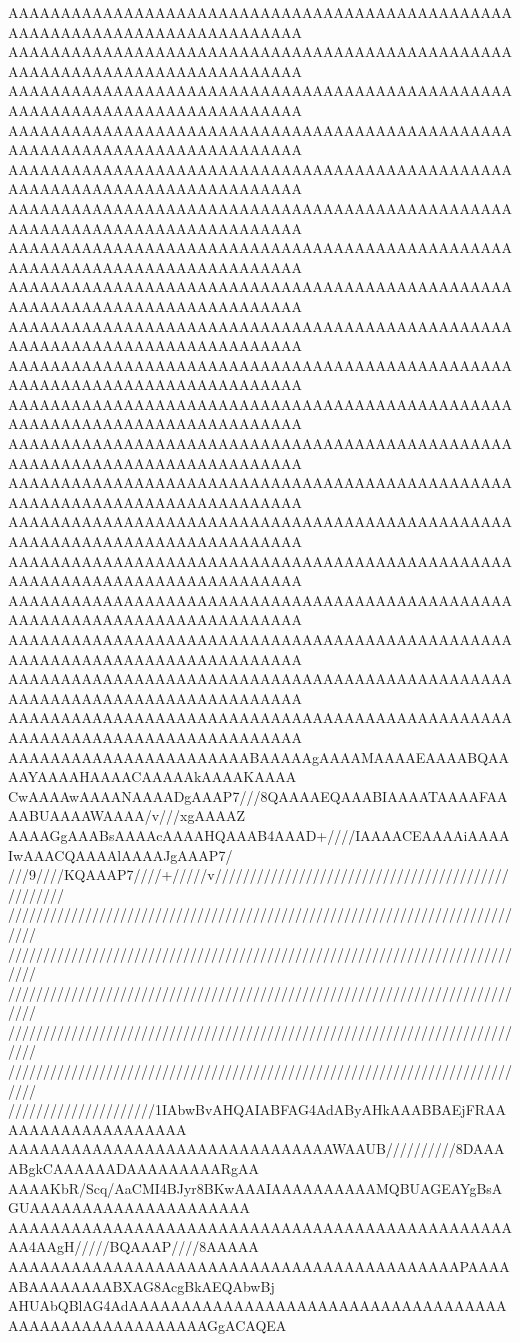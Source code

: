 AAAAAAAAAAAAAAAAAAAAAAAAAAAAAAAAAAAAAAAAAAAAAAAAAAAAAAAAAAAAAAAAAAAAAAAAAAAA
AAAAAAAAAAAAAAAAAAAAAAAAAAAAAAAAAAAAAAAAAAAAAAAAAAAAAAAAAAAAAAAAAAAAAAAAAAAA
AAAAAAAAAAAAAAAAAAAAAAAAAAAAAAAAAAAAAAAAAAAAAAAAAAAAAAAAAAAAAAAAAAAAAAAAAAAA
AAAAAAAAAAAAAAAAAAAAAAAAAAAAAAAAAAAAAAAAAAAAAAAAAAAAAAAAAAAAAAAAAAAAAAAAAAAA
AAAAAAAAAAAAAAAAAAAAAAAAAAAAAAAAAAAAAAAAAAAAAAAAAAAAAAAAAAAAAAAAAAAAAAAAAAAA
AAAAAAAAAAAAAAAAAAAAAAAAAAAAAAAAAAAAAAAAAAAAAAAAAAAAAAAAAAAAAAAAAAAAAAAAAAAA
AAAAAAAAAAAAAAAAAAAAAAAAAAAAAAAAAAAAAAAAAAAAAAAAAAAAAAAAAAAAAAAAAAAAAAAAAAAA
AAAAAAAAAAAAAAAAAAAAAAAAAAAAAAAAAAAAAAAAAAAAAAAAAAAAAAAAAAAAAAAAAAAAAAAAAAAA
AAAAAAAAAAAAAAAAAAAAAAAAAAAAAAAAAAAAAAAAAAAAAAAAAAAAAAAAAAAAAAAAAAAAAAAAAAAA
AAAAAAAAAAAAAAAAAAAAAAAAAAAAAAAAAAAAAAAAAAAAAAAAAAAAAAAAAAAAAAAAAAAAAAAAAAAA
AAAAAAAAAAAAAAAAAAAAAAAAAAAAAAAAAAAAAAAAAAAAAAAAAAAAAAAAAAAAAAAAAAAAAAAAAAAA
AAAAAAAAAAAAAAAAAAAAAAAAAAAAAAAAAAAAAAAAAAAAAAAAAAAAAAAAAAAAAAAAAAAAAAAAAAAA
AAAAAAAAAAAAAAAAAAAAAAAAAAAAAAAAAAAAAAAAAAAAAAAAAAAAAAAAAAAAAAAAAAAAAAAAAAAA
AAAAAAAAAAAAAAAAAAAAAAAAAAAAAAAAAAAAAAAAAAAAAAAAAAAAAAAAAAAAAAAAAAAAAAAAAAAA
AAAAAAAAAAAAAAAAAAAAAAAAAAAAAAAAAAAAAAAAAAAAAAAAAAAAAAAAAAAAAAAAAAAAAAAAAAAA
AAAAAAAAAAAAAAAAAAAAAAAAAAAAAAAAAAAAAAAAAAAAAAAAAAAAAAAAAAAAAAAAAAAAAAAAAAAA
AAAAAAAAAAAAAAAAAAAAAAAAAAAAAAAAAAAAAAAAAAAAAAAAAAAAAAAAAAAAAAAAAAAAAAAAAAAA
AAAAAAAAAAAAAAAAAAAAAAAAAAAAAAAAAAAAAAAAAAAAAAAAAAAAAAAAAAAAAAAAAAAAAAAAAAAA
AAAAAAAAAAAAAAAAAAAAAAAAAAAAAAAAAAAAAAAAAAAAAAAAAAAAAAAAAAAAAAAAAAAAAAAAAAAA
AAAAAAAAAAAAAAAAAAAAAAABAAAAAgAAAAMAAAAEAAAABQAAAAYAAAAHAAAACAAAAAkAAAAKAAAA
CwAAAAwAAAANAAAADgAAAP7///8QAAAAEQAAABIAAAATAAAAFAAAABUAAAAWAAAA/v///xgAAAAZ
AAAAGgAAABsAAAAcAAAAHQAAAB4AAAD+////IAAAACEAAAAiAAAAIwAAACQAAAAlAAAAJgAAAP7/
///9////KQAAAP7////+/////v//////////////////////////////////////////////////
////////////////////////////////////////////////////////////////////////////
////////////////////////////////////////////////////////////////////////////
////////////////////////////////////////////////////////////////////////////
////////////////////////////////////////////////////////////////////////////
////////////////////////////////////////////////////////////////////////////
/////////////////////1IAbwBvAHQAIABFAG4AdAByAHkAAABBAEjFRAAAAAAAAAAAAAAAAAAA
AAAAAAAAAAAAAAAAAAAAAAAAAAAAAAAWAAUB//////////8DAAAABgkCAAAAAADAAAAAAAAARgAA
AAAAKbR/Scq/AaCMI4BJyr8BKwAAAIAAAAAAAAAAMQBUAGEAYgBsAGUAAAAAAAAAAAAAAAAAAAAA
AAAAAAAAAAAAAAAAAAAAAAAAAAAAAAAAAAAAAAAAAAAAAAAAAA4AAgH/////BQAAAP////8AAAAA
AAAAAAAAAAAAAAAAAAAAAAAAAAAAAAAAAAAAAAAAAAAPAAAAABAAAAAAAABXAG8AcgBkAEQAbwBj
AHUAbQBlAG4AdAAAAAAAAAAAAAAAAAAAAAAAAAAAAAAAAAAAAAAAAAAAAAAAAAAAAAAAGgACAQEA
